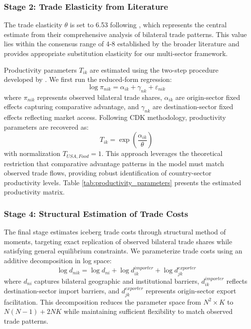 \subsubsection{Stage 2: Trade Elasticity from Literature}

The trade elasticity $\theta$ is set to 6.53 following \cite{costinot2012TheReviewofEconomicStudies}, which represents the central estimate from their comprehensive analysis of bilateral trade patterns. This value lies within the consensus range of 4-8 established by the broader literature \citep{eaton2002Econometrica} and provides appropriate substitution elasticity for our multi-sector framework.


Productivity parameters $T_{ik}$ are estimated using the two-step procedure developed by \cite{costinot2012TheReviewofEconomicStudies}. We first run the reduced-form regression:
\begin{equation}
\log \pi_{nik} = \alpha_{ik} + \gamma_{nk} + \varepsilon_{nik}
\end{equation}
where $\pi_{nik}$ represents observed bilateral trade shares, $\alpha_{ik}$ are origin-sector fixed effects capturing comparative advantage, and $\gamma_{nk}$ are destination-sector fixed effects reflecting market access. Following CDK methodology, productivity parameters are recovered as:
\begin{equation}
 T_{ik} = \exp\left(\frac{\hat{\alpha}_{ik}}{\theta}\right)
\end{equation}
with normalization $T_{USA,Food} = 1$. This approach leverages the theoretical restriction that comparative advantage patterns in the model must match observed trade flows, providing robust identification of country-sector productivity levels. Table \ref{tab:productivity_parameters} presents the estimated productivity matrix.

\subsubsection{Stage 4: Structural Estimation of Trade Costs}

The final stage estimates iceberg trade costs through structural method of moments, targeting exact replication of observed bilateral trade shares while satisfying general equilibrium constraints. We parameterize trade costs using an additive decomposition in log space:
\begin{equation}
\log d_{nik} = \log d_{ni} + \log d_{ik}^{importer} + \log d_{jk}^{exporter}
\end{equation}
where $d_{ni}$ captures bilateral geographic and institutional barriers, $d_{ik}^{importer}$ reflects destination-sector import barriers, and $d_{jk}^{exporter}$ represents origin-sector export facilitation. This decomposition reduces the parameter space from $N^2 \times K$ to $N(N-1) + 2NK$ while maintaining sufficient flexibility to match observed trade patterns.

